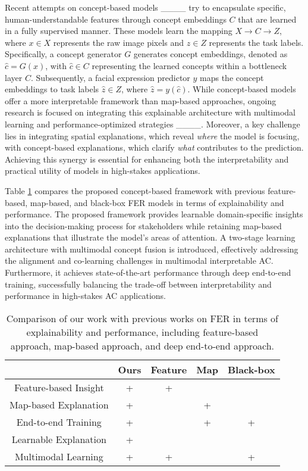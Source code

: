     Recent attempts on concept-based models ____ try to encapsulate specific, human-understandable features through concept embeddings $C$ that are learned in a fully supervised manner. These models learn the mapping $X \rightarrow C \rightarrow Z$, where $x \in X$ represents the raw image pixels and $z \in Z$ represents the task labels. Specifically, a concept generator $G$ generates concept embeddings, denoted as $\hat{c} = G(x)$, with $\hat{c} \in C$ representing the learned concepts within a bottleneck layer $C$. Subsequently, a facial expression predictor $y$ maps the concept embeddings to task labels $\hat{z} \in Z$, where $\hat{z} = y(\hat{c})$. While concept-based models offer a more interpretable framework than map-based approaches, ongoing research is focused on integrating this explainable architecture with multimodal learning and performance-optimized strategies ____. Moreover, a key challenge lies in integrating spatial explanations, which reveal \textit{where} the model is focusing, with concept-based explanations, which clarify \textit{what} contributes to the prediction. Achieving this synergy is essential for enhancing both the interpretability and practical utility of models in high-stakes applications.

    Table \ref{tab_previous_work} compares the proposed concept-based framework with previous feature-based, map-based, and black-box FER models in terms of explainability and performance. The proposed framework provides learnable domain-specific insights into the decision-making process for stakeholders while retaining map-based explanations that illustrate the model's areas of attention. A two-stage learning architecture with multimodal concept fusion is introduced, effectively addressing the alignment and co-learning challenges in multimodal interpretable AC. Furthermore, it achieves state-of-the-art performance through deep end-to-end training, successfully balancing the trade-off between interpretability and performance in high-stakes AC applications.

    \begin{table}[t]
    \centering
    \caption{Comparison of our work with previous works on FER in terms of explainability and performance, including feature-based approach, map-based approach, and deep end-to-end approach.}
    \begin{tabular}{ccccc}
    \toprule
                          & Ours & Feature & Map & Black-box \\ \midrule
    Feature-based Insight & +    & +       &     &     \\
    Map-based Explanation & +    &         & +   &     \\
    End-to-end Training   & +    &         & +   & +   \\
    Learnable Explanation & +    &         &     &     \\
    Multimodal Learning   & +    & +       &     & +   \\ 
    \bottomrule
    \end{tabular}
    \label{tab_previous_work}
    \end{table}